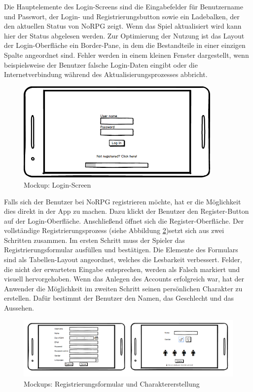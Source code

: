 			Die Hauptelemente des Login-Screens sind die Eingabefelder für Benutzername und Passwort, der Login- und Registrierungsbutton sowie ein Ladebalken, der den aktuellen Status von NoRPG zeigt. Wenn das Spiel aktualisiert wird kann hier der Status abgelesen werden. Zur Optimierung der Nutzung ist das Layout der Login-Oberfläche ein Border-Pane, in dem die Bestandteile in einer einzigen Spalte angeordnet sind. Fehler werden in einem kleinen Fenster dargestellt, wenn beispielsweise der Benutzer falsche Login-Daten eingibt oder die Internetverbindung während des Aktualisierungsprozesses abbricht.

			\begin{figure}[htbp]
				\centering 
				\label{mockupLogin}
				\includegraphics[width=10cm]{pics/Login.png}
				\caption{Mockup: Login-Screen}
			\end{figure}
			
			Falls sich der Benutzer bei NoRPG registrieren möchte, hat er die Möglichkeit dies direkt in der App zu machen. Dazu klickt der Benutzer den Register-Button auf der Login-Oberfläche. Anschließend öffnet sich die Register-Oberfläche. Der vollständige Registrierungsprozess (siehe Abbildung \ref{mockupsRegistrierung})setzt sich aus zwei Schritten zusammen. Im ersten Schritt muss der Spieler das Registrierungsformular ausfüllen und bestätigen. Die Elemente des Formulars sind als Tabellen-Layout angeordnet, welches die Lesbarkeit verbessert. Felder, die nicht der erwarteten Eingabe entsprechen, werden als Falsch markiert und visuell hervorgehoben. Wenn das Anlegen des Accounts erfolgreich war, hat der Anwender die Möglichkeit im zweiten Schritt seinen persönlichen Charakter zu erstellen. Dafür bestimmt der Benutzer den Namen, das Geschlecht und das Aussehen.
			
			\begin{figure}[htbp]
				\centering 
				\label{mockupsRegistrierung}
				\includegraphics[width=\textwidth]{pics/Registerprozess.png}
				\caption{Mockups: Registrierungsformular und Charaktererstellung}
			\end{figure}
		
